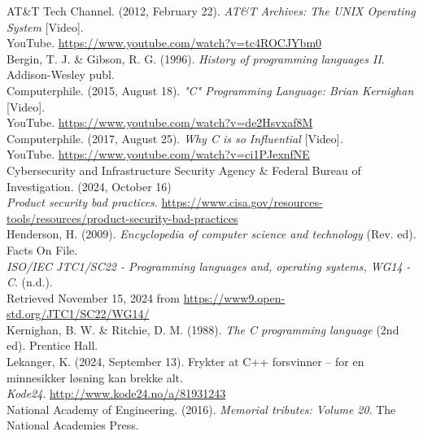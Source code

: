 \documentclass{report}%
\begin{document}
\noindent AT\&T Tech Channel. (2012, February 22). \textit{AT\&T Archives: The UNIX Operating System} [Video].
\\\indent YouTube. \url{https://www.youtube.com/watch?v=tc4ROCJYbm0}\\

\noindent Bergin, T. J. \& Gibson, R. G. (1996). \textit{History of programming languages II}. Addison-Wesley publ.\\

\noindent Computerphile. (2015, August 18). \textit{"C" Programming Language: Brian Kernighan} [Video].
\\\indent YouTube. \url{https://www.youtube.com/watch?v=de2Hsvxaf8M}\\

\noindent Computerphile. (2017, August 25). \textit{Why C is so Influential} [Video].
\\\indent YouTube. \url{https://www.youtube.com/watch?v=ci1PJexnfNE}\\

\noindent Cybersecurity and Infrastructure Security Agency \& Federal Bureau of Investigation. (2024, October 16)
\\\indent \textit{Product security bad practices}. \url{https://www.cisa.gov/resources-tools/resources/product-security-bad-practices}\\

\noindent Henderson, H. (2009). \textit{Encyclopedia of computer science and technology} (Rev. ed). Facts On File.\\

\noindent \textit{ISO/IEC JTC1/SC22 - Programming languages and, operating systems, WG14 - C}. (n.d.).
\\\indent Retrieved November 15, 2024 from \url{https://www9.open-std.org/JTC1/SC22/WG14/}\\

\noindent Kernighan, B. W. \& Ritchie, D. M. (1988). \textit{The C programming language} (2nd ed). Prentice Hall.\\

\noindent Lekanger, K. (2024, September 13). Frykter at C++ forsvinner – for en minnesikker løsning kan brekke alt.
\\\indent \textit{Kode24}. \url{http://www.kode24.no/a/81931243}\\

\noindent National Academy of Engineering. (2016). \textit{Memorial tributes: Volume 20}. The National Academies Press.\\
\end{document}
